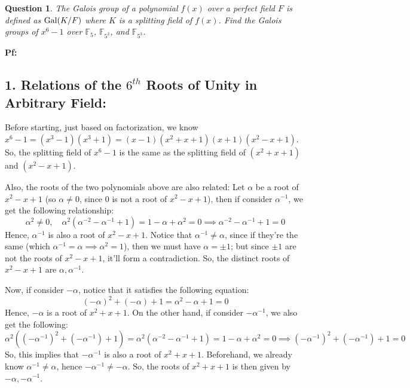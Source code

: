 \documentclass{article}
\newtheorem{question}{Question}
\newcommand{\FF}{\mathbb{F}}
\newcommand{\Gal}{\textmd{Gal}}
\begin{document}
\break

\section{}%
\begin{question}\label{q5}
    The Galois group of a polynomial $f(x)$ over a perfect field $F$ is defined as $\Gal(K/F)$ where $K$ is a splitting field of $f(x)$. Find the Galois groups of $x^6-1$ over $\FF_5$, $\FF_{5^2}$, and $\FF_{5^3}$.
\end{question}

\textbf{Pf:}

\subsection*{1. Relations of the $6^{th}$ Roots of Unity in Arbitrary Field:}
Before starting, just based on factorization, we know $x^6-1 = (x^3-1)(x^3+1) = (x-1)(x^2+x+1)(x+1)(x^2-x+1)$. So, the splitting field of $x^6-1$ is the same as the splitting field of $(x^2+x+1)$ and $(x^2-x+1)$.

Also, the roots of the two polynomials above are also related: Let $\alpha$ be a root of $x^2-x+1$ (so $\alpha\neq 0$, since $0$ is not a root of $x^2-x+1$),  then if consider $\alpha^{-1}$, we get the following relationship:
\begin{equation}
    \label{eq:8}
    \alpha^2\neq 0,\quad \alpha^2(\alpha^{-2}-\alpha^{-1}+1) = 1-\alpha+\alpha^2 = 0\implies \alpha^{-2}-\alpha^{-1}+1 = 0
\end{equation}
Hence, $\alpha^{-1}$ is also a root of $x^2-x+1$. Notice that $\alpha^{-1}\neq \alpha$, since if they're the same (which $\alpha^{-1}=\alpha\implies \alpha^2=1$), then we must have $\alpha=\pm 1$; but since $\pm 1$ are not the roots of $x^2-x+1$, it'll form a contradiction. So, the distinct roots of $x^2-x+1$ are $\alpha,\alpha^{-1}$.

Now, if consider $-\alpha$, notice that it satisfies the following equation:
\begin{equation}
    \label{eq:9}
    (-\alpha)^2 + (-\alpha)+1 = \alpha^2-\alpha+1=0
\end{equation}
Hence, $-\alpha$ is a root of $x^2+x+1$. On the other hand, if consider $-\alpha^{-1}$, we also get the following:
\begin{equation}
    \label{eq:10}
    \alpha^2((-\alpha^{-1})^2+(-\alpha^{-1})+1) = \alpha^2(\alpha^{-2}-\alpha^{-1}+1) = 1-\alpha+\alpha^2 = 0 \implies (-\alpha^{-1})^2+(-\alpha^{-1})+1=0
\end{equation}
So, this implies that $-\alpha^{-1}$ is also a root of $x^2+x+1$. Beforehand, we already know $\alpha^{-1}\neq \alpha$, hence $-\alpha^{-1}\neq -\alpha$. So, the roots of $x^2+x+1$ is then given by $-\alpha,-\alpha^{-1}$.
\end{document}
